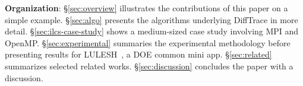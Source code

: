 {\bf Organization\/}: 
%
\S\ref{sec:overview} illustrates the contributions of this paper on a simple example.
%
\S\ref{sec:algo} presents the algorithms underlying DiffTrace in more detail.
%
\S\ref{sec:ilcs-case-study} shows a medium-sized case study involving MPI and OpenMP.
%
\S\ref{sec:experimental} summaries the experimental methodology before presenting results for LULESH~\cite{lulesh}, a DOE common mini app.
%
\S\ref{sec:related} summarizes selected related works.
%
\S\ref{sec:discussion} concludes the paper with a discussion.

% 
% 
% 
% 
% 


